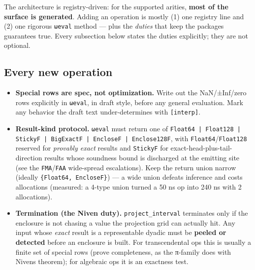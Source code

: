 The architecture is registry-driven: for the supported arities, \textbf{most of the surface is generated}. Adding an operation is mostly (1) one registry line and (2) one rigorous \texttt{ωeval} method — plus the \emph{duties} that keep the package{\textquotesingle}s guarantees true. Every subsection below states the duties explicitly; they are not optional.



\subsection{Every new operation}



\label{17182734479202268885}{}


\begin{itemize}
\item[1. ] \textbf{Special rows are spec, not optimization.} Write out the NaN/±Inf/zero rows explicitly in \texttt{ωeval}, in draft style, before any general evaluation. Mark any behavior the draft text under-determines with \texttt{[interp]}.


\item[2. ] \textbf{Result-kind protocol.} \texttt{ωeval} must return one of \texttt{Float64 | Float128 | StickyF | BigExactF | EncloseF | Enclose128F}, with \texttt{Float64}/\allowbreak\texttt{Float128} reserved for \emph{provably exact} results and \texttt{StickyF} for exact-head-plus-tail-direction results whose soundness bound is discharged at the emitting site (see the \texttt{FMA}/\allowbreak\texttt{FAA} wide-spread escalations). Keep the return union narrow (ideally \texttt{\{Float64, EncloseF\}}) — a wide union defeats inference and costs allocations (measured: a 4-type union turned a 50 ns op into 240 ns with 2 allocations).


\item[3. ] \textbf{Termination (the Niven duty).} \texttt{project\_\allowbreak{}interval} terminates only if the enclosure is not chasing a value the projection grid can actually hit. Any input whose \emph{exact} result is a representable dyadic must be \textbf{peeled or detected} before an enclosure is built. For transcendental ops this is usually a finite set of special rows (prove completeness, as the π-family does with Niven{\textquotesingle}s theorem); for algebraic ops it is an exactness test.



\end{itemize}
